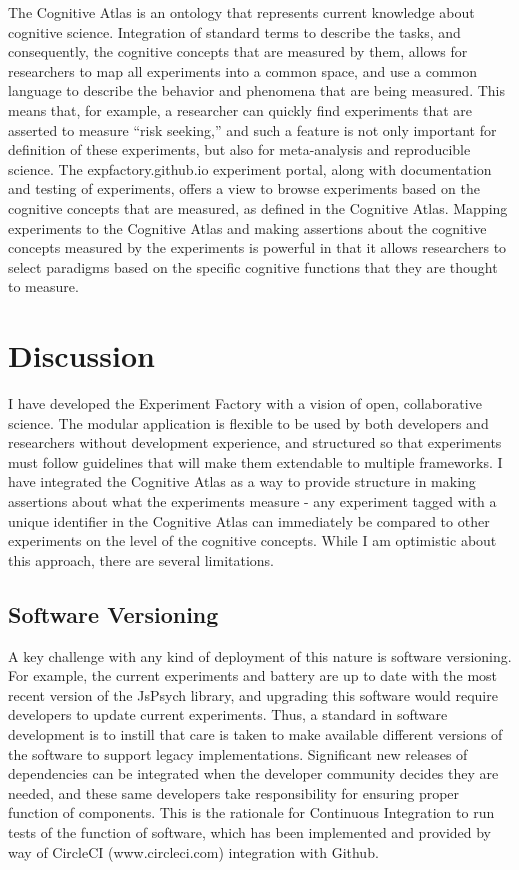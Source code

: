 \documentclass{report}
\begin{document}
The Cognitive Atlas \cite{Poldrack2011-jp} is
an ontology that represents current knowledge about cognitive science.
Integration of standard terms to describe the tasks, and consequently,
the cognitive concepts that are measured by them, allows for researchers
to map all experiments into a common space, and use a common language to
describe the behavior and phenomena that are being measured. This means
that, for example, a researcher can quickly find experiments that are
asserted to measure ``risk seeking,'' and such a feature is not only
important for definition of these experiments, but also for
meta-analysis and reproducible science. The expfactory.github.io
experiment portal, along with documentation and testing of experiments,
offers a view to browse experiments based on the cognitive concepts that
are measured, as defined in the Cognitive Atlas. Mapping experiments to
the Cognitive Atlas and making assertions about the cognitive concepts
measured by the experiments is powerful in that it allows researchers to
select paradigms based on the specific cognitive functions that they are
thought to measure.

\section{Discussion}

I have developed the Experiment Factory with a vision of open,
collaborative science. The modular application is flexible to be used by
both developers and researchers without development experience, and
structured so that experiments must follow guidelines that will make
them extendable to multiple frameworks. I have integrated the Cognitive
Atlas as a way to provide structure in making assertions about what the
experiments measure - any experiment tagged with a unique identifier in
the Cognitive Atlas can immediately be compared to other experiments on
the level of the cognitive concepts. While I am optimistic about this
approach, there are several limitations.

\subsection{Software Versioning}

A key challenge with any kind of deployment of this nature is software
versioning. For example, the current experiments and battery are up to
date with the most recent version of the JsPsych library, and upgrading
this software would require developers to update current experiments.
Thus, a standard in software development is to instill that care is
taken to make available different versions of the software to support
legacy implementations. Significant new releases of dependencies can be
integrated when the developer community decides they are needed, and
these same developers take responsibility for ensuring proper function
of components. This is the rationale for Continuous Integration to run
tests of the function of software, which has been implemented and
provided by way of CircleCI (www.circleci.com) integration with Github.
\end{document}
